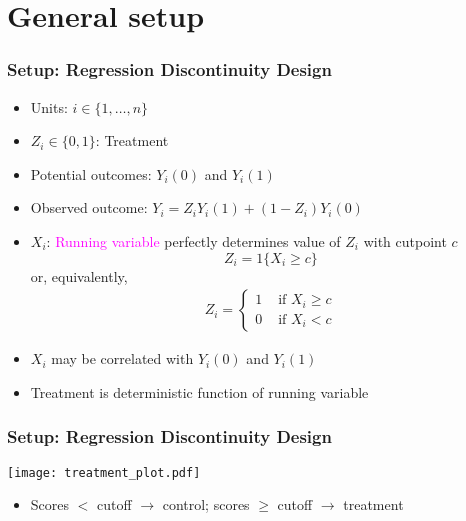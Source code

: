 \documentclass[table, xcolor = {dvipsnames}, 9pt]{beamer}
\theoremstyle{plain}
\begin{document}
\section{General setup}
\begin{frame}
\frametitle{Setup: Regression Discontinuity Design} 
\begin{itemize} \vfill
\item Units: $i \in \{1, \ldots, n\}$
\item $Z_i \in \{0,1\}$: Treatment
\item Potential outcomes: $Y_i(0)$ and $Y_i(1)$
\item Observed outcome: $Y_i = Z_i Y_i(1) + (1-Z_i) Y_i(0)$ 
\item $X_i$: \textcolor{magenta}{Running variable} perfectly determines value of $Z_i$ with cutpoint $c$
\begin{equation*}
Z_i = 1\{X_i \geq c\} 
\end{equation*}
or, equivalently, 
\begin{align*}
Z_i = 
\begin{cases}
1 & \text{ if } X_i \geq c \\
0 & \text{ if } X_i < c
\end{cases}
\end{align*} \vfill
\item $X_i$ may be correlated with $Y_i(0)$ and $Y_i(1)$ \vfill
\item Treatment is deterministic function of running variable \vfill
\end{itemize} \vfill
\end{frame}
\begin{frame}
\frametitle{Setup: Regression Discontinuity Design} 
\vfill
\begin{center}
\texttt{[image: treatment\_plot.pdf]}
\end{center}
\vfill
\begin{itemize} \vfill
\item Scores $<$ cutoff $\rightarrow$ control; scores $\geq$ cutoff $\rightarrow$ treatment \vfill
\end{itemize} \vfill
\end{frame}
\end{document}
